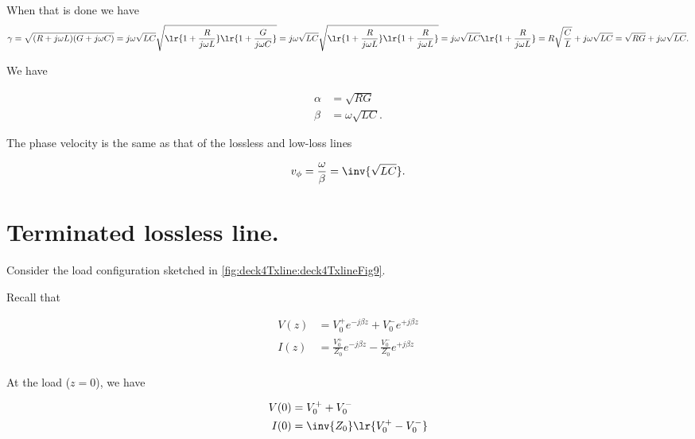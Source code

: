 When that is done we have
\begin{dmath}\label{eqn:uwaves4TransmissionLines:780}
\gamma 
= \sqrt{ (R + j \omega L) ( G + j \omega C ) }
= j \omega \sqrt{L C} \sqrt{ 
\lr{ 1 + \frac{R}{j \omega L} }
\lr{ 1 + \frac{G}{j \omega C} }
}
= j \omega \sqrt{L C} \sqrt{ 
\lr{ 1 + \frac{R}{j \omega L} }
\lr{ 1 + \frac{R}{j \omega L} }
}
= j \omega \sqrt{L C} 
\lr{ 1 + \frac{R}{j \omega L} }
= R \sqrt{\frac{C}{L} } 
+ j \omega \sqrt{L C}
= \sqrt{R G }
+ j \omega \sqrt{L C}.
\end{dmath}

We have 

\begin{equation}\label{eqn:uwaves4TransmissionLines:800}
\begin{aligned}
\alpha &= \sqrt{R G } \\
\beta &= \omega \sqrt{L C}.
\end{aligned}
\end{equation}

The phase velocity is the same as that of the lossless and low-loss lines

\begin{equation}\label{eqn:uwaves4TransmissionLines:820}
v_\phi = \frac{\omega}{\beta} = \inv{\sqrt{L C}}.
\end{equation}

\section{Terminated lossless line.}

Consider the load configuration sketched in \cref{fig:deck4Txline:deck4TxlineFig9}.


Recall that

\begin{equation}\label{eqn:uwaves4TransmissionLines:840}
\begin{aligned}
V(z) &= V_0^{+} e^{-j \beta z} + V_0^{-} e^{+j \beta z} \\
I(z) &= \frac{V_0^{+}}{Z_0} e^{-j \beta z} - \frac{V_0^{-}}{Z_0} e^{+j \beta z} \\
\end{aligned}
\end{equation}

At the load (\( z = 0 \)), we have

\begin{equation}\label{eqn:uwaves4TransmissionLines:860}
\begin{aligned}
V(0) &= V_0^{+} + V_0^{-} \\
I(0) &= \inv{Z_0} \lr{ V_0^{+} - V_0^{-} }
\end{aligned}
\end{equation}

